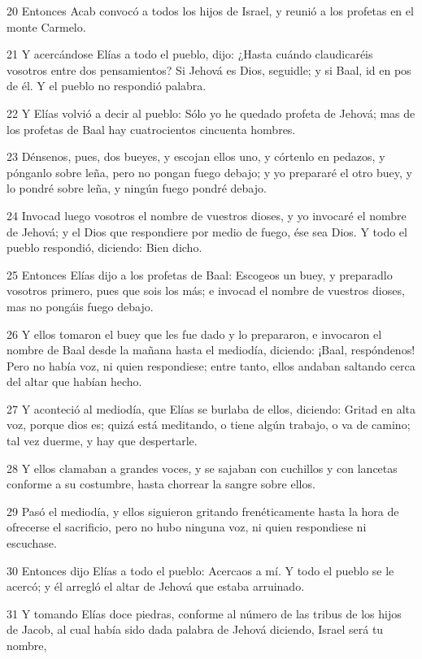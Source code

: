\par 20 Entonces Acab convocó a todos los hijos de Israel, y reunió a los profetas en el monte Carmelo.
\par 21 Y acercándose Elías a todo el pueblo, dijo: ¿Hasta cuándo claudicaréis vosotros entre dos pensamientos? Si Jehová es Dios, seguidle; y si Baal, id en pos de él. Y el pueblo no respondió palabra.
\par 22 Y Elías volvió a decir al pueblo: Sólo yo he quedado profeta de Jehová; mas de los profetas de Baal hay cuatrocientos cincuenta hombres.
\par 23 Dénsenos, pues, dos bueyes, y escojan ellos uno, y córtenlo en pedazos, y pónganlo sobre leña, pero no pongan fuego debajo; y yo prepararé el otro buey, y lo pondré sobre leña, y ningún fuego pondré debajo.
\par 24 Invocad luego vosotros el nombre de vuestros dioses, y yo invocaré el nombre de Jehová; y el Dios que respondiere por medio de fuego, ése sea Dios. Y todo el pueblo respondió, diciendo: Bien dicho.
\par 25 Entonces Elías dijo a los profetas de Baal: Escogeos un buey, y preparadlo vosotros primero, pues que sois los más; e invocad el nombre de vuestros dioses, mas no pongáis fuego debajo.
\par 26 Y ellos tomaron el buey que les fue dado y lo prepararon, e invocaron el nombre de Baal desde la mañana hasta el mediodía, diciendo: ¡Baal, respóndenos! Pero no había voz, ni quien respondiese; entre tanto, ellos andaban saltando cerca del altar que habían hecho.
\par 27 Y aconteció al mediodía, que Elías se burlaba de ellos, diciendo: Gritad en alta voz, porque dios es; quizá está meditando, o tiene algún trabajo, o va de camino; tal vez duerme, y hay que despertarle.
\par 28 Y ellos clamaban a grandes voces, y se sajaban con cuchillos y con lancetas conforme a su costumbre, hasta chorrear la sangre sobre ellos.
\par 29 Pasó el mediodía, y ellos siguieron gritando frenéticamente hasta la hora de ofrecerse el sacrificio, pero no hubo ninguna voz, ni quien respondiese ni escuchase.
\par 30 Entonces dijo Elías a todo el pueblo: Acercaos a mí. Y todo el pueblo se le acercó; y él arregló el altar de Jehová que estaba arruinado.
\par 31 Y tomando Elías doce piedras, conforme al número de las tribus de los hijos de Jacob, al cual había sido dada palabra de Jehová diciendo, Israel será tu nombre, 
